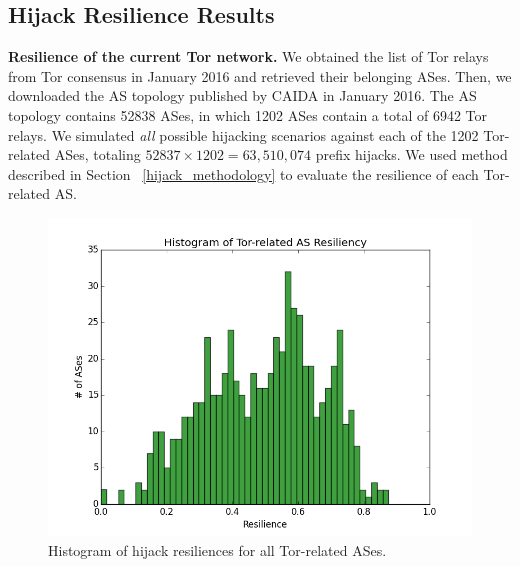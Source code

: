
\subsection{Hijack Resilience Results}

{\bf Resilience of the current Tor network.} We obtained the list of Tor relays from Tor consensus in January 2016 and retrieved their belonging ASes. Then, we downloaded the AS topology published by CAIDA in January 2016. The AS topology contains 52838 ASes, in which 1202 ASes contain a total of 6942 Tor relays. We simulated \emph{all} possible hijacking scenarios against each of the 1202 Tor-related ASes, totaling $52837 \times 1202 = 63,510,074$ prefix hijacks. We used method described in Section ~\ref{hijack_methodology} to evaluate the resilience of each Tor-related AS. 

\begin{figure}[ht!]
\centering
\includegraphics[width=.4\textwidth]{resilience_histogram}
\caption{Histogram of hijack resiliences for all Tor-related ASes.}
\label{fig:hijack_resilience_histogram}
\end{figure}

